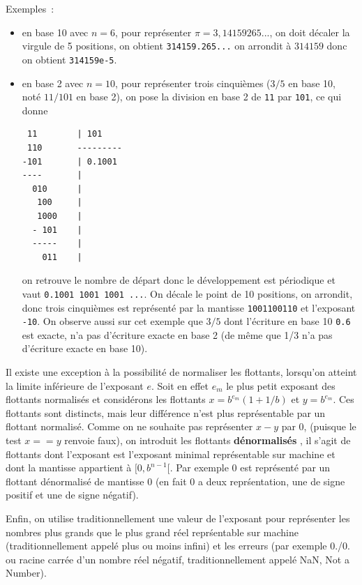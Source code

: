 \documentclass[a4paper,11pt]{book}
\begin{document}
\begin{giacjshere}
Exemples~: 
\begin{itemize}
\item en base 10 avec $n=6$, pour repr\'esenter
$\pi=3,14159265...$, on doit d\'ecaler la virgule de 5 positions,
on obtient \verb|314159.265...| on arrondit \`a $314159$ donc
on obtient \verb|314159e-5|.
\item en base 2 avec $n=10$, pour repr\'esenter trois cinqui\`emes ($3/5$
en base 10, not\'e $11/101$ en base 2), 
on pose la division en base 2 de \verb|11| par 
\verb|101|, ce qui donne
\begin{verbatim}
 11        | 101
 110       ---------
-101       | 0.1001
----       |
  010      |
   100     |
   1000    |
  - 101    |
  -----    |
    011    |
\end{verbatim}
on retrouve le nombre de d\'epart donc le d\'eveloppement est
p\'eriodique et vaut \verb|0.1001 1001 1001 ...|.
On d\'ecale le point de 10 positions, on arrondit,
donc trois cinqui\`emes est
repr\'esent\'e par la mantisse \verb|1001100110| et l'exposant
\verb|-10|. On observe aussi sur cet exemple que $3/5$ dont l'\'ecriture
en base 10 \verb|0.6| est exacte, n'a pas d'\'ecriture exacte en base
2 (de m\^eme que 1/3 n'a pas d'\'ecriture exacte en base 10).
\end{itemize}

Il existe une exception \`a la possibilit\'e de normaliser les flottants,
lorsqu'on atteint la limite inf\'erieure de l'exposant $e$. 
Soit en effet $e_m$ le plus petit exposant des flottants normalis\'es
et consid\'erons les flottants $x=b^{e_m}(1+1/b)$ et $y=b^{e_m}$. Ces
flottants sont distincts, 
mais leur diff\'erence n'est plus repr\'esentable par un flottant normalis\'e.
Comme on ne souhaite pas repr\'esenter $x-y$ par 0, 
(puisque le test $x==y$ renvoie faux), on introduit les flottants 
{\bf d\'enormalis\'es} , il s'agit de
flottants dont l'exposant est l'exposant minimal repr\'esentable sur
machine et dont la mantisse appartient \`a $[0,b^{n-1}[$. Par exemple
0 est repr\'esent\'e par un flottant d\'enormalis\'e de mantisse 0
(en fait 0 a deux repr\'sentation, une de signe positif et une de
signe n\'egatif).

Enfin, on utilise traditionnellement une valeur de l'exposant pour
repr\'esenter les nombres plus grands que le plus grand r\'eel
repr\'sentable sur machine (traditionnellement appel\'e plus ou
moins infini)
et les erreurs (par exemple 0./0. ou racine carr\'ee d'un nombre
r\'eel n\'egatif, traditionnellement appel\'e NaN, Not a Number).


\end{giacjshere}
\end{document}
